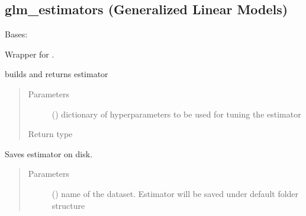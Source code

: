 \documentclass[letterpaper,10pt,english]{sphinxmanual}
\begin{document}
\subsection{glm\_estimators (Generalized Linear Models)}
\label{\detokenize{estimators:module-mleap.estimators.glm_estimators}}\label{\detokenize{estimators:glm-estimators-generalized-linear-models}}

\begin{fulllineitems}
\label{\detokenize{estimators:mleap.estimators.glm_estimators.Lasso}}
Bases: {\hyperref[\detokenize{estimators:mleap.estimators.mleap_estimator.MleapEstimator}]{}}

Wrapper for .

\begin{fulllineitems}
\label{\detokenize{estimators:mleap.estimators.glm_estimators.Lasso.build}}
builds and returns estimator
\begin{quote}\begin{description}
\item[{Parameters}] \leavevmode
{} () \textendash{} dictionary of hyperparameters to be used for tuning the estimator

\item[{Return type}] \leavevmode
{}

\end{description}\end{quote}

\end{fulllineitems}


\begin{fulllineitems}
\label{\detokenize{estimators:mleap.estimators.glm_estimators.Lasso.save}}
Saves estimator on disk.
\begin{quote}\begin{description}
\item[{Parameters}] \leavevmode
{} () \textendash{} name of the dataset. Estimator will be saved under default folder structure 


\end{description}
\end{quote}
\end{fulllineitems}
\end{fulllineitems}
\end{document}

